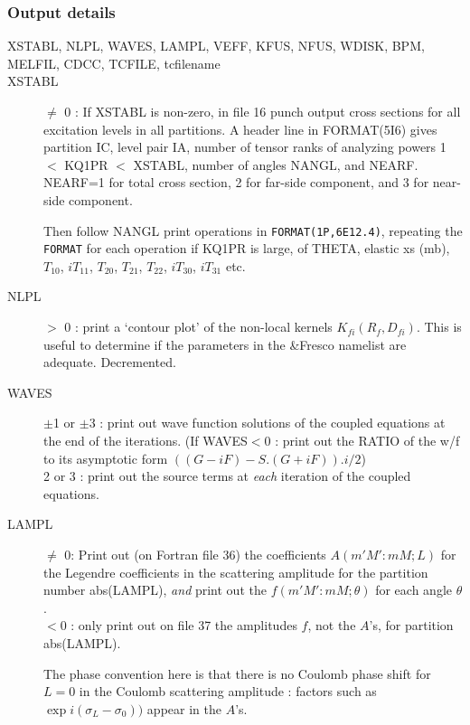 \documentclass[11pt]{article}
\begin{document}
\subsubsection{Output details}

\begin{description}
\item[XSTABL, NLPL, WAVES, LAMPL, VEFF, KFUS, NFUS, WDISK, BPM, MELFIL, CDCC,  TCFILE, tcfilename]

\item[XSTABL] $\neq$ 0 : If XSTABL is non-zero, in file 16 punch output cross sections
for all excitation levels in all partitions.
A header line in FORMAT(5I6) gives partition IC, level pair IA,
number of tensor ranks of analyzing powers 1 $<$ KQ1PR $<$ XSTABL,
number of angles NANGL, and NEARF.  NEARF=1 for total cross section,
2 for far-side component, and 3 for near-side component.

Then follow NANGL print operations in
{\tt FORMAT(1P,6E12.4)}, repeating
the {\tt FORMAT} for each operation if KQ1PR is large,
of THETA, elastic xs (mb), $T_{10}$, $iT_{11}$,
$T_{20}$, $ T_{21}$, $ T_{22}$, $ iT_{30}$, $ iT_{31}$
etc.

\item[NLPL]   $>$ 0 : print a `contour plot' of the non-local kernels
$K_{fi}(R_{f},D_{fi})$.  This is useful to determine if the parameters in the \&Fresco namelist
are adequate.  Decremented.

\item[WAVES]
  $\pm$1 or $\pm$3 : print out wave function solutions of the coupled
equations at the end of the iterations.
(If WAVES$<$0 : print out the RATIO of the w/f to its asymptotic
form $((G-iF) - S.(G+iF)).i/2$)
\\  2 or 3     : print out the source terms at
{\em each} iteration of the coupled equations.



\item[LAMPL]
  $\neq$ 0: Print out (on Fortran file 36)
the coefficients $A(m'M':mM; L)$ for the Legendre
coefficients in the scattering amplitude for the partition number
abs(LAMPL),
{\em and}
print out the $f(m'M':mM; \theta)$ for each angle $\theta$.
\\ $<$0 : only print out on file 37 the amplitudes $f$, not the $A$'s,
for partition abs(LAMPL).

The phase convention here is that there is no Coulomb phase shift
for $L = 0$ in the Coulomb scattering amplitude : factors such as
$\exp i(\sigma_L-\sigma_0))$  appear in the $A$'s.



\end{description}
\end{document}
